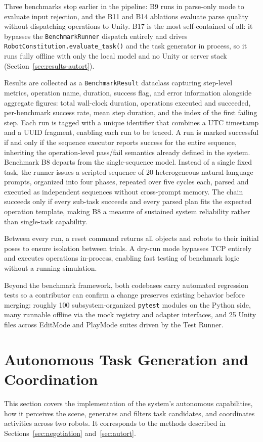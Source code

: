 \documentclass[
     12pt,
     a4paper,
     BCOR=10mm,
     DIV=14,
     listof=totoc,
     bibliography=totoc,
     parskip,
     twoside,
     headsepline
     ]{scrreprt}
\begin{document}
Three benchmarks stop earlier in the pipeline: B9 runs in parse-only mode to evaluate input rejection, and the B11 and B14 ablations evaluate parse quality without dispatching operations to Unity. B17 is the most self-contained of all: it bypasses the \texttt{BenchmarkRunner} dispatch entirely and drives \texttt{RobotConstitution.evaluate\_task()} and the task generator in process, so it runs fully offline with only the local model and no Unity or server stack (Section~\ref{sec:results-autort}).

Results are collected as a \texttt{BenchmarkResult} dataclass capturing step-level metrics, operation name, duration, success flag, and error information alongside aggregate figures: total wall-clock duration, operations executed and succeeded, per-benchmark success rate, mean step duration, and the index of the first failing step. Each run is tagged with a unique identifier that combines a UTC timestamp and a UUID fragment, enabling each run to be traced. A run is marked successful if and only if the sequence executor reports success for the entire sequence, inheriting the operation-level pass/fail semantics already defined in the system. Benchmark B8 departs from the single-sequence model. Instead of a single fixed task, the runner issues a scripted sequence of 20 heterogeneous natural-language prompts, organized into four phases, repeated over five cycles each, parsed and executed as independent sequences without cross-prompt memory. The chain succeeds only if every sub-task succeeds and every parsed plan fits the expected operation template, making B8 a measure of sustained system reliability rather than single-task capability.

Between every run, a reset command returns all objects and robots to their initial poses to ensure isolation between trials. A dry-run mode bypasses TCP entirely and executes operations in-process, enabling fast testing of benchmark logic without a running simulation.

Beyond the benchmark framework, both codebases carry automated regression tests so a contributor can confirm a change preserves existing behavior before merging: roughly 100 subsystem-organized \texttt{pytest} modules on the Python side, many runnable offline via the mock registry and adapter interfaces, and 25 Unity files across EditMode and PlayMode suites driven by the Test Runner.

\section{Autonomous Task Generation and Coordination}\label{sec:autort-impl}
This section covers the implementation of the system's autonomous capabilities, how it perceives the scene, generates and filters task candidates, and coordinates activities across two robots. It corresponds to the methods described in Sections~\ref{sec:negotiation} and~\ref{sec:autort}.
\end{document}
